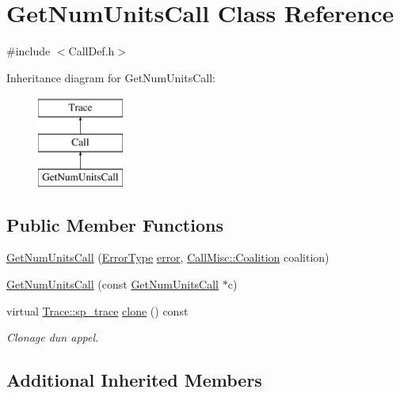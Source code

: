 \hypertarget{class_get_num_units_call}{}\section{Get\+Num\+Units\+Call Class Reference}
\label{class_get_num_units_call}


{\ttfamily \#include $<$Call\+Def.\+h$>$}

Inheritance diagram for Get\+Num\+Units\+Call\+:\begin{figure}[H]
\begin{center}
\leavevmode
\includegraphics[height=3.000000cm]{class_get_num_units_call}
\end{center}
\end{figure}
\subsection*{Public Member Functions}
\begin{DoxyCompactItemize}
\item 
\hyperlink{class_get_num_units_call_a093f1ca9dcd35921b62fc1e23fb315e7}{Get\+Num\+Units\+Call} (\hyperlink{class_call_ade833a08ce215aaa4121102f3448c898}{Error\+Type} \hyperlink{class_call_a206f6150a8038fda48c17c2c7421aed1}{error}, \hyperlink{namespace_call_misc_a490b3c2ef1a821675848ebcab0b677d8}{Call\+Misc\+::\+Coalition} coalition)
\item 
\hyperlink{class_get_num_units_call_ae85cafa25d8c81e510df0694f770e37a}{Get\+Num\+Units\+Call} (const \hyperlink{class_get_num_units_call}{Get\+Num\+Units\+Call} $\ast$c)
\item 
virtual \hyperlink{class_trace_a9c58e523529fc8a03fb6acf3eef86150}{Trace\+::sp\+\_\+trace} \hyperlink{class_get_num_units_call_a279250063949139d58842ae5a6b39b03}{clone} () const 
\begin{DoxyCompactList}\small\item\em Clonage d\textquotesingle{}un appel. \end{DoxyCompactList}\end{DoxyCompactItemize}
\subsection*{Additional Inherited Members}



